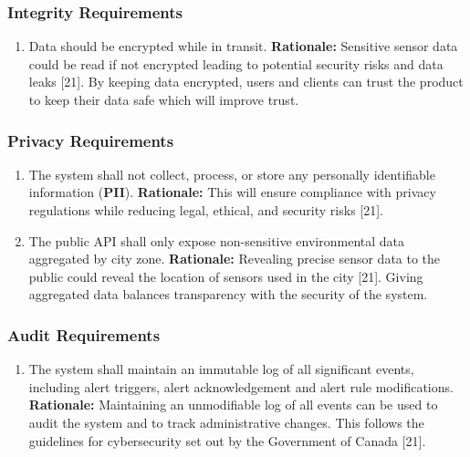 \documentclass[]{article}
\begin{document}
\subsubsection{Integrity Requirements}
\label{ssub:integrity_requirements}
\begin{enumerate}[{SR-INT}1. ]
	\item Data should be encrypted while in transit.\newline
	{\bf Rationale:} Sensitive sensor data could be read if not encrypted leading to potential security risks and data leaks [21]. By keeping data encrypted, users and clients can trust the product to keep their data safe which will improve trust.
\end{enumerate}

\subsubsection{Privacy Requirements}
\label{ssub:privacy_requirements}
\begin{enumerate}[{SR-P}1. ]
	\item The system shall not collect, process, or store any personally identifiable information (\textbf{PII}).\newline
	{\bf Rationale:} This will ensure compliance with privacy regulations while reducing legal, ethical, and security risks [21].
	\item The public API shall only expose non-sensitive environmental data aggregated by city zone.\newline
	{\bf Rationale:} Revealing precise sensor data to the public could reveal the location of sensors used in the city [21]. Giving aggregated data balances transparency with the security of the system.
\end{enumerate}

\subsubsection{Audit Requirements}
\label{ssub:audit_requirements}
\begin{enumerate}[{SR-AU}1. ]
	\item The system shall maintain an immutable log of all significant events, including alert triggers, alert acknowledgement and alert rule modifications.\newline
	{\bf Rationale:} Maintaining an unmodifiable log of all events can be used to audit the system and to track administrative changes. This follows the guidelines for cybersecurity set out by the Government of Canada [21].
\end{enumerate}
\end{document}
